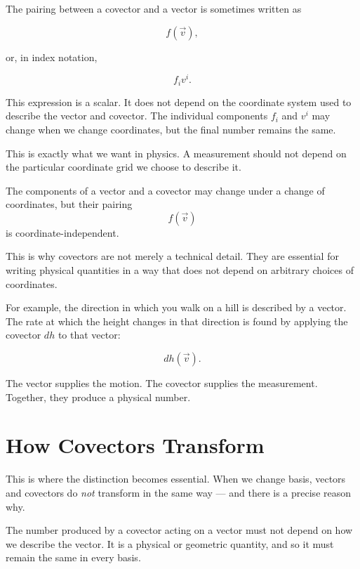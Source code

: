 \documentclass[11pt,openany]{book}
\theoremstyle{definition}
\begin{document}
\medskip

The pairing between a covector and a vector is sometimes written as

\[
f(\vec{v}),
\]

or, in index notation,

\[
f_i v^i.
\]

This expression is a scalar. It does not depend on the coordinate system used to
describe the vector and covector. The individual components \(f_i\) and \(v^i\)
may change when we change coordinates, but the final number remains the same.

\medskip

This is exactly what we want in physics. A measurement should not depend on the
particular coordinate grid we choose to describe it.

\begin{keyidea}
The components of a vector and a covector may change under a change of
coordinates, but their pairing
\[
f(\vec{v})
\]
is coordinate-independent.
\end{keyidea}

\medskip

This is why covectors are not merely a technical detail. They are essential for
writing physical quantities in a way that does not depend on arbitrary choices
of coordinates.

\medskip

For example, the direction in which you walk on a hill is described by a vector.
The rate at which the height changes in that direction is found by applying the
covector \(dh\) to that vector:

\[
dh(\vec{v}).
\]

The vector supplies the motion. The covector supplies the measurement. Together,
they produce a physical number.

\medskip
\section{How Covectors Transform}

This is where the distinction becomes essential. When we change basis, vectors
and covectors do \textit{not} transform in the same way --- and there is a precise
reason why.

\medskip

\begin{keyidea}
The number produced by a covector acting on a vector must
not depend on how we describe the vector. It is a physical or geometric quantity,
and so it must remain the same in every basis.
\end{keyidea}
\medskip
\end{document}

